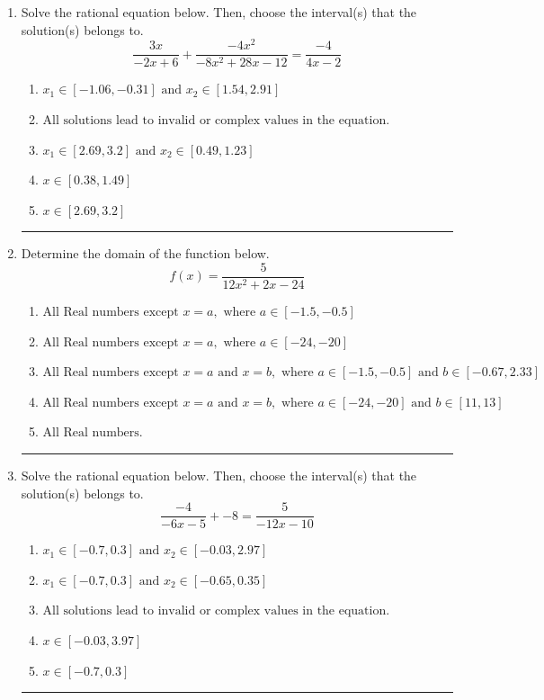 \documentclass[14pt]{extbook}
\newcommand{\litem}[1]{\item#1\hspace*{-1cm}\rule{\textwidth}{0.4pt}}
\begin{document}
\begin{enumerate}
{\begin{enumerate}[label=\Alph*.]
\end{enumerate} }
\litem{
Solve the rational equation below. Then, choose the interval(s) that the solution(s) belongs to.\[ \frac{3x}{-2x + 6} + \frac{-4x^{2}}{-8x^{2} +28 x -12} = \frac{-4}{4x -2} \]\begin{enumerate}[label=\Alph*.]
\item \( x_1 \in [-1.06, -0.31] \text{ and } x_2 \in [1.54,2.91] \)
\item \( \text{All solutions lead to invalid or complex values in the equation.} \)
\item \( x_1 \in [2.69, 3.2] \text{ and } x_2 \in [0.49,1.23] \)
\item \( x \in [0.38,1.49] \)
\item \( x \in [2.69,3.2] \)

\end{enumerate} }
\litem{
Determine the domain of the function below.\[ f(x) = \frac{5}{12x^{2} +2 x -24} \]\begin{enumerate}[label=\Alph*.]
\item \( \text{All Real numbers except } x = a, \text{ where } a \in [-1.5, -0.5] \)
\item \( \text{All Real numbers except } x = a, \text{ where } a \in [-24, -20] \)
\item \( \text{All Real numbers except } x = a \text{ and } x = b, \text{ where } a \in [-1.5, -0.5] \text{ and } b \in [-0.67, 2.33] \)
\item \( \text{All Real numbers except } x = a \text{ and } x = b, \text{ where } a \in [-24, -20] \text{ and } b \in [11, 13] \)
\item \( \text{All Real numbers.} \)

\end{enumerate} }
\litem{
Solve the rational equation below. Then, choose the interval(s) that the solution(s) belongs to.\[ \frac{-4}{-6x -5} + -8 = \frac{5}{-12x -10} \]\begin{enumerate}[label=\Alph*.]
\item \( x_1 \in [-0.7, 0.3] \text{ and } x_2 \in [-0.03,2.97] \)
\item \( x_1 \in [-0.7, 0.3] \text{ and } x_2 \in [-0.65,0.35] \)
\item \( \text{All solutions lead to invalid or complex values in the equation.} \)
\item \( x \in [-0.03,3.97] \)
\item \( x \in [-0.7,0.3] \)


\end{enumerate}}
\end{enumerate}
\end{document}
